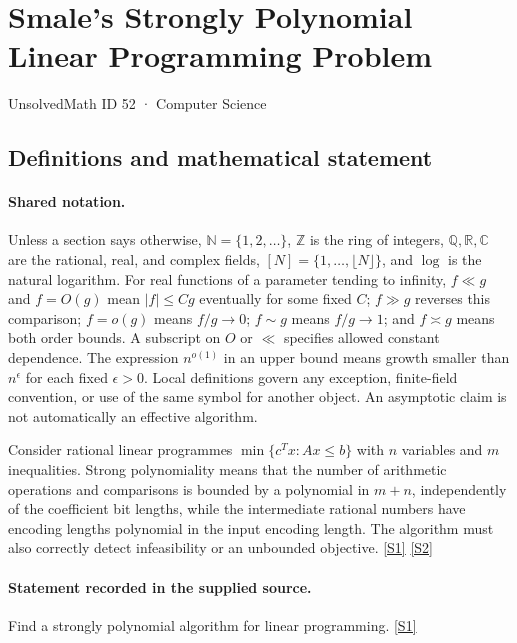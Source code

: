 \documentclass[11pt,a4paper]{article}
\newcommand{\N}{\mathbb{N}}
\newcommand{\Z}{\mathbb{Z}}
\newcommand{\Q}{\mathbb{Q}}
\newcommand{\R}{\mathbb{R}}
\newcommand{\C}{\mathbb{C}}
\newcommand{\sref}[2]{\hyperlink{source:#1:#2}{[S#2]}}
\begin{document}

\setcounter{section}{51}

\section{Smale's Strongly Polynomial Linear Programming Problem}\label{52}

{\small\sffamily UnsolvedMath ID 52 · Computer Science}

\subsection{Definitions and mathematical statement}

\paragraph{Shared notation.}Unless a section says otherwise, $\N=\{1,2,\ldots\}$,
$\Z$ is the ring of integers, $\Q,\R,\C$ are the rational, real, and complex
fields, $[N]=\{1,\ldots,\lfloor N\rfloor\}$, and $\log$ is the natural
logarithm. For real functions of a parameter tending to infinity,
$f\ll g$ and $f=O(g)$ mean $|f|\leq Cg$ eventually for some fixed $C$;
$f\gg g$ reverses this comparison; $f=o(g)$ means $f/g\to0$;
$f\sim g$ means $f/g\to1$; and $f\asymp g$ means both order bounds.
A subscript on $O$ or $\ll$ specifies allowed constant dependence.
The expression $n^{o(1)}$ in an upper bound means growth smaller than
$n^\epsilon$ for each fixed $\epsilon>0$. Local definitions govern any
exception, finite-field convention, or use of the same symbol for another
object. An asymptotic claim is not automatically an effective algorithm.



Consider rational linear programmes $\min\{c^Tx:Ax\leq b\}$ with $n$ variables and $m$ inequalities. Strong polynomiality means that the number of arithmetic operations and comparisons is bounded by a polynomial in $m+n$, independently of the coefficient bit lengths, while the intermediate rational numbers have encoding lengths polynomial in the input encoding length. The algorithm must also correctly detect infeasibility or an unbounded objective. \sref{52}{1} \sref{52}{2}

\paragraph{Statement recorded in the supplied source.}
Find a strongly polynomial algorithm for linear programming. \sref{52}{1}
\end{document}
